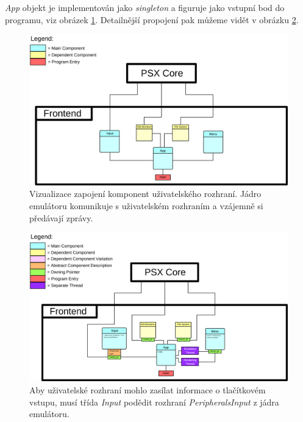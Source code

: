 \textit{App} objekt je implementován jako \textit{singleton} a figuruje jako vstupní bod do programu, viz obrázek \ref{frontend-arch-simple}. Detailnější propojení
pak můžeme vidět v obrázku \ref{frontend-arch-detailed}.

\begin{figure}[h]
	\centering
	\includegraphics[width=1.0\textwidth]{obrazky-figures/frontend-arch-simple.png}
	\caption[Návrh architektury uživatelského rozhraní]{Vizualizace zapojení komponent uživatelského rozhraní. Jádro emulátoru komunikuje s uživatelském rozhraním a vzájemně si předávají zprávy. }
	\label{frontend-arch-simple}
\end{figure}

\begin{figure}[h]
	\centering
	\includegraphics[width=1.0\textwidth]{obrazky-figures/frontend-arch-detailed.png}
	\caption[Detailní návrh architektury uživatelského rozhraní]{Aby uživatelské rozhraní mohlo zasílat informace o tlačítkovém vstupu, musí třída \textit{Input} podědit rozhraní \textit{PeripheralsInput} z jádra emulátoru.}
	\label{frontend-arch-detailed}
\end{figure}

